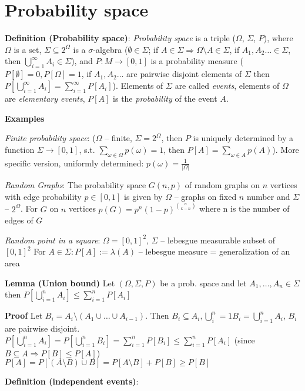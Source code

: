 \documentclass[a4paper]{article}
\begin{document}
 
\section*{Probability space}
\textbf{Definition (Probability space)}: \emph{Probability space} is a triple ($\Omega$, $\Sigma$, $P$), where $\Omega$ is a set, $\Sigma \subseteq 2^{\Omega}$ is a $\sigma$-algebra ($\emptyset \in \Sigma$;
if $A \in \Sigma \Rightarrow \Omega \setminus A \in \Sigma$, if $A_1, A_2\ldots \in \Sigma$, then $\bigcup^{\infty}_{i=1} A_i \in \Sigma$),
and $P: M \rightarrow [0,1]$ is a probability measure ($P[\emptyset] = 0, P[\Omega] = 1$,
if $A_1, A_2\ldots$ are pairwise disjoint elements of $\Sigma$ then $P[\bigcup^{\infty}_{i=1}A_i] = \sum^{\infty}_{i=1} P[A_i]$).
Elements of $\Sigma$ are called \emph{events}, elements of $\Omega$ are \emph{elementary events}, $P[A]$ is the \emph{probability} of the event $A$.

\textbf{Examples}

\emph{Finite probability space}: ($\Omega$ -- finite, $\Sigma = 2^\Omega$, then $P$ is uniquely determined by a function $\Sigma \rightarrow [0,1]$, s.t. $\sum_{\omega \in \Omega} p(\omega) = 1$, then $P[A] = \sum_{\omega \in A} p(A)$). More specific version, uniformly determined: $p(\omega) = \frac{1}{|\Omega|}$

\emph{Random Graphs}: The probability space $G(n,p)$ of random graphs on $n$ vertices with edge probability $p \in [0,1]$ is given by $\Omega$ -- graphs on fixed $n$ number and $\Sigma$ -- $2^\Omega$.
For $G$ on $n$ vertices $p(G) = p^n (1-p)^{n \choose k - n}$ where n is the number of edges of $G$

\emph{Random point in a square}:
$\Omega = [0,1]^2$, $\Sigma$ -- lebesgue measurable subset of $[0,1]^2$
For $A \in \Sigma: P[A] := \lambda(A)$ -- lebesgue measure = generalization of an area

\textbf{Lemma (Union bound)} Let $(\Omega, \Sigma, P)$ be a prob. space and let $A_1, \ldots, A_n \in \Sigma$ then $P\left[\bigcup^n_{i=1}A_i\right] \leq \sum^n_{i=1} P[A_i]$

\textbf{Proof} Let $B_i = A_i \setminus (A_1 \cup \ldots \cup A_{i-1})$.
Then $B_i \subseteq A_i, \bigcup^n_i=1 B_i = \bigcup^n_{i=1} A_i$, $B_i$ are pairwise disjoint.
$P[\bigcup_{i=1}^n A_i] = P[\bigcup_{i=1}^n B_i] = \sum_{i=1}^n P[B_i] \leq \sum_{i=1}^n P[A_i]$
(since $B \subseteq A \Rightarrow P[B] \leq P[A]$)
$P[A] = P[(A \setminus B) \cup B] = P[A \setminus B] + P[B] \geq P[B]$

\textbf{Definition (independent events)}:
\end{document}

